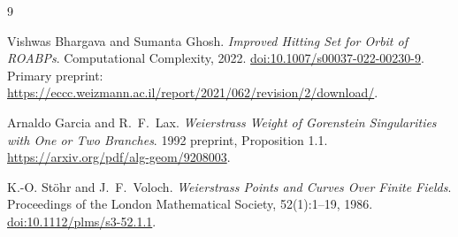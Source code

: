 \begin{thebibliography}{9}\raggedright
{}
Vishwas Bhargava and Sumanta Ghosh.
\emph{Improved Hitting Set for Orbit of ROABPs}.
Computational Complexity, 2022.
\href{https://doi.org/10.1007/s00037-022-00230-9}{doi:10.1007/s00037-022-00230-9}.
Primary preprint:
\url{https://eccc.weizmann.ac.il/report/2021/062/revision/2/download/}.

Arnaldo Garcia and R.\ F.\ Lax.
\emph{Weierstrass Weight of Gorenstein Singularities with One or Two Branches}.
1992 preprint, Proposition 1.1.
\url{https://arxiv.org/pdf/alg-geom/9208003}.

K.-O. St\"ohr and J.\ F.\ Voloch.
\emph{Weierstrass Points and Curves Over Finite Fields}.
Proceedings of the London Mathematical Society, 52(1):1--19, 1986.
\href{https://doi.org/10.1112/plms/s3-52.1.1}{doi:10.1112/plms/s3-52.1.1}.
\end{thebibliography}

